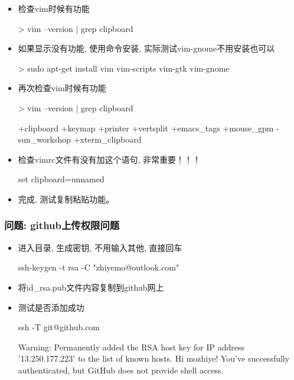 \begin{itemize}
\item 检查vim时候有功能
\begin{commandbox}
 > vim --version | grep clipboard
\end{commandbox}

\item 如果显示没有功能, 使用命令安装, 实际测试vim-gnome不用安装也可以
\begin{commandbox}
 > sudo apt-get install vim vim-scripts vim-gtk vim-gnome
\end{commandbox}

\item 再次检查vim时候有功能
\begin{commandbox}
 > vim --version | grep clipboard
\end{commandbox}

\begin{messagebox}
+clipboard         +keymap            +printer           +vertsplit
+emacs_tags        +mouse_gpm         -sun_workshop      +xterm_clipboard
\end{messagebox}

\item 检查vimrc文件有没有加这个语句, 非常重要！！！
\begin{messagebox}
set clipboard=unnamed
\end{messagebox}

\item 完成, 测试复制粘贴功能。

\end{itemize}

\subsubsection{问题: github上传权限问题}
\begin{itemize}

\item 进入目录, 生成密钥, 不用输入其他, 直接回车
\begin{commandbox}
ssh-keygen -t rsa -C "zhiyemo@outlook.com"
\end{commandbox}

\item 将id\_rsa.pub文件内容复制到github网上

\item 测试是否添加成功
\begin{commandbox}
ssh -T git@github.com
\end{commandbox}

\begin{messagebox}
Warning: Permanently added the RSA host key for IP address '13.250.177.223' to the list of known hosts.
Hi mozhiye! You've successfully authenticated, but GitHub does not provide shell access.
\end{messagebox}

\end{itemize}

